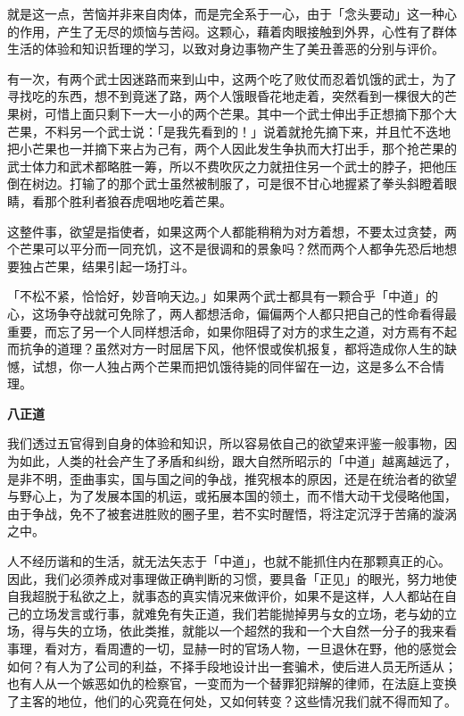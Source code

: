 \documentclass[12pt,twoside,openany]{book}
\newcommand{\mt}[1]{\textbullet \textbf{#1}}
\begin{document}
就是这一点，苦恼并非来自肉体，而是完全系于一心，由于「念头要动」这一种心的作用，产生了无尽的烦恼与苦闷。这颗心，藉着肉眼接触到外界，心性有了群体生活的体验和知识哲理的学习，以致对身边事物产生了美丑善恶的分别与评价。

有一次，有两个武士因迷路而来到山中，这两个吃了败仗而忍着饥饿的武士，为了寻找吃的东西，想不到竟迷了路，两个人饿眼昏花地走着，突然看到一棵很大的芒果树，可惜上面只剩下一大一小的两个芒果。其中一个武士伸出手正想摘下那个大芒果，不料另一个武士说：「是我先看到的！」说着就抢先摘下来，并且忙不迭地把小芒果也一并摘下来占为己有，两个人因此发生争执而大打出手，那个抢芒果的武士体力和武术都略胜一筹，所以不费吹灰之力就扭住另一个武士的脖子，把他压倒在树边。打输了的那个武士虽然被制服了，可是很不甘心地握紧了拳头斜瞪着眼睛，看那个胜利者狼吞虎咽地吃着芒果。

这整件事，欲望是指使者，如果这两个人都能稍稍为对方着想，不要太过贪婪，两个芒果可以平分而一同充饥，这不是很调和的景象吗？然而两个人都争先恐后地想要独占芒果，结果引起一场打斗。

「不松不紧，恰恰好，妙音响天边。」如果两个武士都具有一颗合乎「中道」的心，这场争夺战就可免除了，两人都想活命，偏偏两个人都只把自己的性命看得最重要，而忘了另一个人同样想活命，如果你阻碍了对方的求生之道，对方焉有不起而抗争的道理？虽然对方一时屈居下风，他怀恨或俟机报复，都将造成你人生的缺憾，试想，你一人独占两个芒果而把饥饿待毙的同伴留在一边，这是多么不合情理。

\mt{八正道}

我们透过五官得到自身的体验和知识，所以容易依自己的欲望来评鉴一般事物，因为如此，人类的社会产生了矛盾和纠纷，跟大自然所昭示的「中道」越离越远了，是非不明，歪曲事实，国与国之间的争战，推究根本的原因，还是在统治者的欲望与野心上，为了发展本国的机运，或拓展本国的领土，而不惜大动干戈侵略他国，由于争战，免不了被套进胜败的圈子里，若不实时醒悟，将注定沉浮于苦痛的漩涡之中。

人不经历谐和的生活，就无法矢志于「中道」，也就不能抓住内在那颗真正的心。因此，我们必须养成对事理做正确判断的习惯，要具备「正见」的眼光，努力地使自我超脱于私欲之上，就事态的真实情况来做评价，如果不是这样，人人都站在自己的立场发言或行事，就难免有失正道，我们若能抛掉男与女的立场，老与幼的立场，得与失的立场，依此类推，就能以一个超然的我和一个大自然一分子的我来看事理，看对方，看周遭的一切，显赫一时的官场人物，一旦退休在野，他的感觉会如何？有人为了公司的利益，不择手段地设计出一套骗术，使后进人员无所适从；也有人从一个嫉恶如仇的检察官，一变而为一个替罪犯辩解的律师，在法庭上变换了主客的地位，他们的心究竟在何处，又如何转变？这些情况我们就不得而知了。
\end{document}
